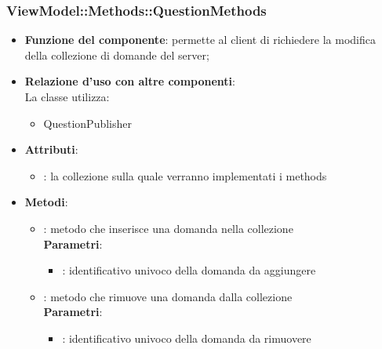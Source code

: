 \subsubsection{ViewModel::Methods::QuestionMethods}
\begin{itemize}
\item\textbf{Funzione del componente}: permette al client di richiedere la modifica della collezione di domande del server;
	\item\textbf{Relazione d'uso con altre componenti}: \\
La classe utilizza:
	\begin{itemize}
		\item QuestionPublisher
	\end{itemize}
\item\textbf{Attributi}:
	\begin{itemize}
		\item{}: la collezione sulla quale verranno implementati i methods\\
	\end{itemize}
\item\textbf{Metodi}:
	\begin{itemize}
		\item{}: metodo che inserisce una domanda nella collezione\\
		\textbf{Parametri}:
			\begin{itemize}
				\item{}: identificativo univoco della domanda da aggiungere\\
			\end{itemize}
		\item{}: metodo che rimuove una domanda dalla collezione\\
		\textbf{Parametri}:
			\begin{itemize}
				\item{}: identificativo univoco della domanda da rimuovere\\
			\end{itemize}
	\end{itemize}
\end{itemize}

